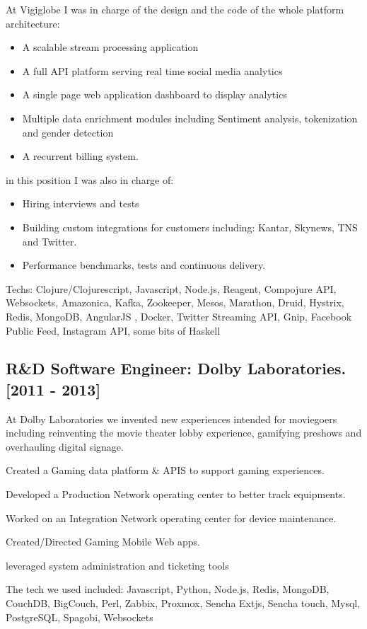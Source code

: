\documentclass{article}
\begin{document}
At Vigiglobe I was in charge of the design and the code of the whole platform architecture:

\begin{itemize}
\item A scalable stream processing application
\item A full API platform serving real time social media analytics
\item A single page web application dashboard to display analytics
\item Multiple data enrichment modules including Sentiment analysis, tokenization and gender detection
\item A recurrent billing system.
\end{itemize}
in this position I was also in charge of:

\begin{itemize}
\item Hiring interviews and tests
\item Building custom integrations for customers including: Kantar, Skynews, TNS and Twitter.
\item Performance benchmarks, tests and continuous delivery.
\end{itemize}
Techs: Clojure/Clojurescript, Javascript, Node.js, Reagent, Compojure API,
Websockets, Amazonica, Kafka, Zookeeper, Mesos, Marathon, Druid, Hystrix, Redis, MongoDB,
AngularJS , Docker, Twitter Streaming API, Gnip, Facebook Public Feed, Instagram API, some bits of Haskell

\subsection*{R\&D Software Engineer: Dolby Laboratories. [2011 - 2013]}
At Dolby Laboratories we invented new experiences intended for moviegoers including
reinventing the movie theater lobby experience, gamifying preshows and overhauling digital signage.

Created a Gaming data platform \& APIS to support gaming experiences.

Developed a Production Network operating center to better track equipments.

Worked on an Integration Network operating center for device maintenance.

Created/Directed Gaming Mobile Web apps.

leveraged system administration and ticketing tools


The tech we used included: Javascript, Python, Node.js, Redis, MongoDB, CouchDB, BigCouch, Perl, Zabbix, Proxmox,
Sencha Extjs, Sencha touch, Mysql, PostgreSQL, Spagobi, Websockets
\end{document}
